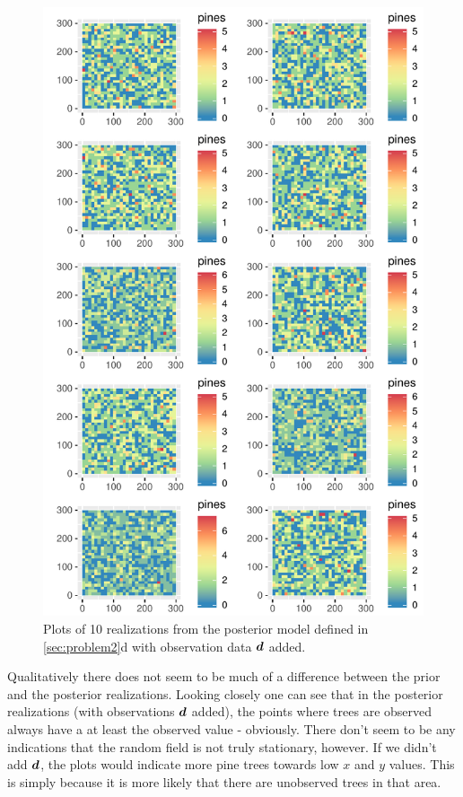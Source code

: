 \begin{figure}
    \centering
    \includegraphics{figures/p2_posterior_sims.pdf}
    \caption{Plots of 10 realizations from the posterior model defined in \ref{sec:problem2}d with observation data $\bm{d}$ added.}
    \label{fig:p2_posterior_sims}
\end{figure}

Qualitatively there does not seem to be much of a difference between the prior and the posterior realizations. Looking closely one can see that in the posterior realizations (with observations $\bm{d}$ added), the points where trees are observed always have a at least the observed value - obviously. There don't seem to be any indications that the random field is not truly stationary, however. If we didn't add $\bm{d}$, the plots would indicate more pine trees towards low $x$ and $y$ values. This is simply because it is more likely that there are unobserved trees in that area.


